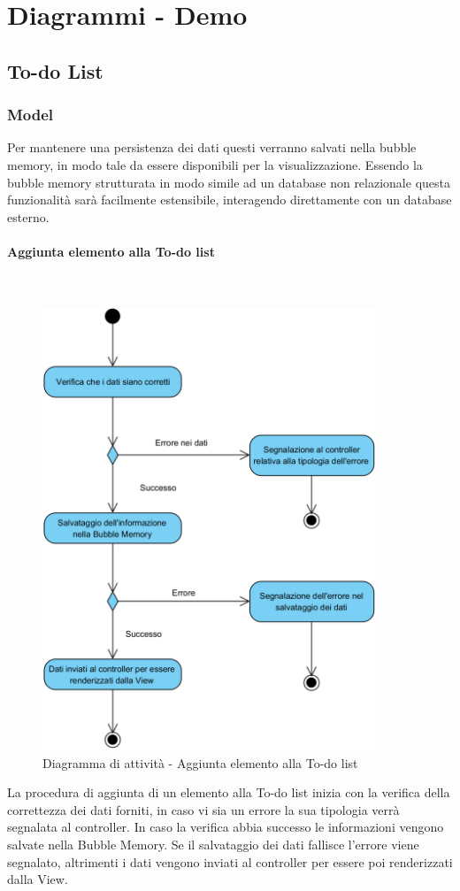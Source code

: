 \section{Diagrammi - Demo}

\subsection{To-do List}

\subsubsection{Model}
Per mantenere una persistenza dei dati questi verranno salvati nella bubble memory, in modo tale da essere disponibili per la visualizzazione. Essendo la bubble memory strutturata in modo simile ad un database non relazionale questa funzionalità sarà facilmente estensibile, interagendo direttamente con un database esterno.

\paragraph{Aggiunta elemento alla To-do list}\mbox{}\\
\nopagebreak
\begin{figure}[H]
	\centering
	\includegraphics[width=10cm]{../../documenti/SpecificaTecnica/diagrammi_img/attivita/addelementtodolist.png}
	\caption{Diagramma di attività - Aggiunta elemento alla To-do list}
\end{figure}
La procedura di aggiunta di un elemento alla To-do list inizia con la verifica della correttezza dei dati forniti, in caso vi sia un errore la sua tipologia verrà segnalata al controller. In caso la verifica abbia successo le informazioni vengono salvate nella Bubble Memory. Se il salvataggio dei dati fallisce l'errore viene segnalato, altrimenti i dati vengono inviati al controller per essere poi renderizzati dalla View.

